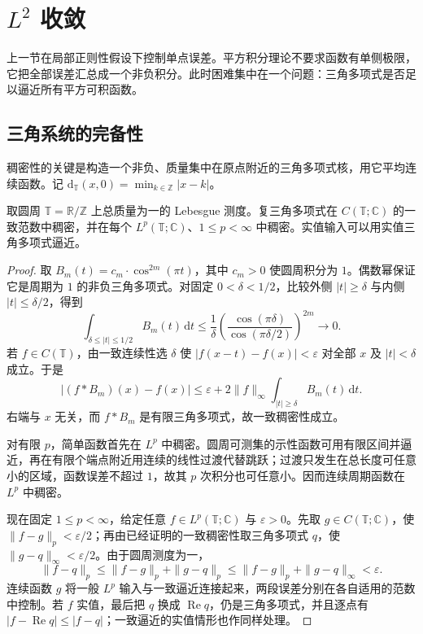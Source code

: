 \section{\texorpdfstring{\(L^2\)}{L²} 收敛}
\label{b2:sec:0203}

上一节在局部正则性假设下控制单点误差。平方积分理论不要求函数有单侧极限，它把全部误差汇总成一个非负积分。此时困难集中在一个问题：三角多项式是否足以逼近所有平方可积函数。

\subsection{三角系统的完备性}
\label{b2:subsec:020301}

稠密性的关键是构造一个非负、质量集中在原点附近的三角多项式核，用它平均连续函数。记 \(\mathrm{d}_{\mathbb T}(x,0)=\min_{k\in\mathbb Z}|x-k|\)。

\begin{lemma}\label{b2:lem:02-trigonometric-density}
取圆周 \(\mathbb T=\mathbb R/\mathbb Z\) 上总质量为一的 Lebesgue 测度。复三角多项式在 \(C(\mathbb T;\mathbb C)\) 的一致范数中稠密，并在每个 \(L^p(\mathbb T;\mathbb C)\)、\(1\leq p<\infty\) 中稠密。实值输入可以用实值三角多项式逼近。
\end{lemma}
\begin{proof}
取 \(B_m(t)=c_m\cdot\cos^{2m}(\pi t)\)，其中 \(c_m>0\) 使圆周积分为 \(1\)。偶数幂保证它是周期为 \(1\) 的非负三角多项式。对固定 \(0<\delta<1/2\)，比较外侧 \(|t|\geq\delta\) 与内侧 \(|t|\leq\delta/2\)，得到
\[
 \int_{\delta\leq|t|\leq1/2}B_m(t)\,\mathrm{d}t
 \leq\dfrac1\delta
 \left(\dfrac{\cos(\pi\delta)}{\cos(\pi\delta/2)}\right)^{2m}
 \longrightarrow0.
\]
若 \(f\in C(\mathbb T)\)，由一致连续性选 \(\delta\) 使 \(|f(x-t)-f(x)|<\varepsilon\) 对全部 \(x\) 及 \(|t|<\delta\) 成立。于是
\[
 |(f*B_m)(x)-f(x)|
 \leq\varepsilon+2\|f\|_\infty\int_{|t|\geq\delta}B_m(t)\,\mathrm{d}t.
\]
右端与 \(x\) 无关，而 \(f*B_m\) 是有限三角多项式，故一致稠密性成立。

对有限 \(p\)，简单函数首先在 \(L^p\) 中稠密。圆周可测集的示性函数可用有限区间并逼近，再在有限个端点附近用连续的线性过渡代替跳跃；过渡只发生在总长度可任意小的区域，函数误差不超过 \(1\)，故其 \(p\) 次积分也可任意小。因而连续周期函数在 \(L^p\) 中稠密。

现在固定 \(1\leq p<\infty\)，给定任意 \(f\in L^p(\mathbb T;\mathbb C)\) 与 \(\varepsilon>0\)。先取 \(g\in C(\mathbb T;\mathbb C)\)，使 \(\|f-g\|_p<\varepsilon/2\)；再由已经证明的一致稠密性取三角多项式 \(q\)，使 \(\|g-q\|_\infty<\varepsilon/2\)。由于圆周测度为一，
\[
 \|f-q\|_p
 \leq\|f-g\|_p+\|g-q\|_p
 \leq\|f-g\|_p+\|g-q\|_\infty
 <\varepsilon.
\]
连续函数 \(g\) 将一般 \(L^p\) 输入与一致逼近连接起来，两段误差分别在各自适用的范数中控制。若 \(f\) 实值，最后把 \(q\) 换成 \(\operatorname{Re}q\)，仍是三角多项式，并且逐点有 \(|f-\operatorname{Re}q|\leq|f-q|\)；一致逼近的实值情形也作同样处理。
\end{proof}

